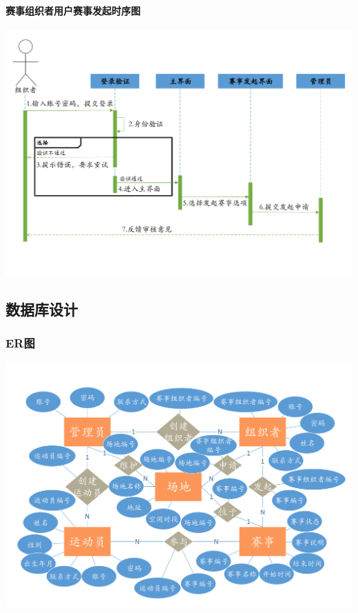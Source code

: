 \documentclass[a4paper,UTF8]{article}
\begin{document}
\paragraph{赛事组织者用户赛事发起时序图}
{\centering\includegraphics[width=1\columnwidth]{sd2}
	
}

	

	

\subsection{数据库设计}
\subsubsection{ER图}
{\centering\includegraphics[width=1\columnwidth]{er}
	
}
\end{document}

